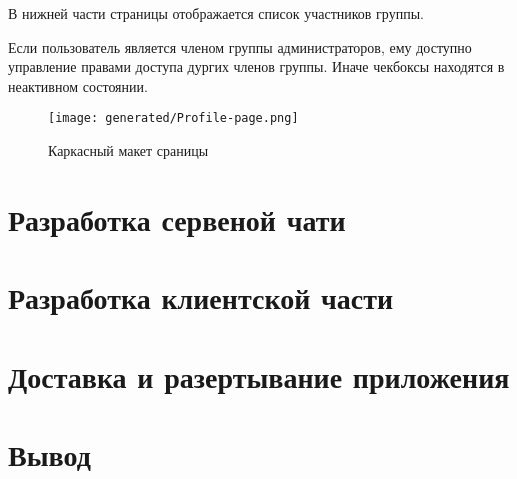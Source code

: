 В нижней части страницы отображается список участников группы.

Если пользователь является членом группы администраторов, ему доступно управление правами доступа дургих членов группы. Иначе чекбоксы находятся в неактивном состоянии.

\begin{figure*}[!t]
  \centering
  \texttt{[image: generated/Profile-page.png]}
  \caption{Каркасный макет сраницы }
  \label{Profile-page}
\end{figure*}

\section{Разработка сервеной чати}

\section{Разработка клиентской части}

\section{Доставка и разертывание приложения}

\section{Вывод}